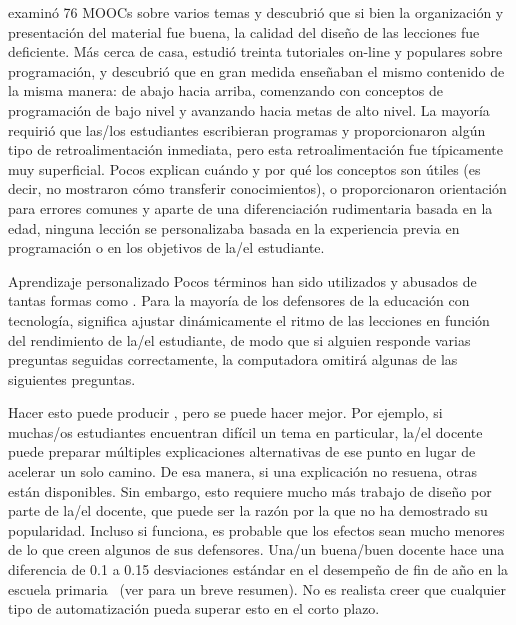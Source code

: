 \cite{Marg2015} examinó 76 MOOCs sobre varios temas y descubrió que
si bien la organización y presentación del material fue buena,
la calidad del diseño de las lecciones fue deficiente.
Más cerca de casa,
\cite{Kim2017} estudió treinta tutoriales on-line y populares sobre programación,
y descubrió que en gran medida enseñaban el mismo contenido de la misma manera:
de abajo hacia arriba,
comenzando con conceptos de programación de bajo nivel y avanzando hacia metas de alto nivel.
La mayoría requirió que las/los estudiantes escribieran programas y proporcionaron algún tipo de retroalimentación inmediata,
pero esta retroalimentación fue típicamente muy superficial.
Pocos explican cuándo y por qué los conceptos son útiles
(es decir, no mostraron cómo transferir conocimientos),
o proporcionaron orientación para errores comunes
y aparte de una diferenciación rudimentaria basada en la edad,
ninguna lección se personalizaba basada en la experiencia previa en programación o en los objetivos de la/el estudiante.

\begin{aside}{Aprendizaje personalizado}
  Pocos términos han sido utilizados y abusados de tantas formas
  como .
  Para la mayoría de los defensores de la educación con tecnología,
  significa ajustar dinámicamente el ritmo de las lecciones en función del rendimiento de la/el estudiante,
  de modo que si alguien responde varias preguntas seguidas correctamente,
  la computadora omitirá algunas de las siguientes preguntas.

  Hacer esto puede producir
  ,
  pero se puede hacer mejor.
  Por ejemplo,
  si muchas/os estudiantes encuentran difícil un tema en particular,
  la/el docente puede preparar múltiples explicaciones alternativas de ese punto
  en lugar de acelerar un solo camino.
  De esa manera,
  si una explicación no resuena,
  otras están disponibles.
  Sin embargo,
  esto requiere mucho más trabajo de diseño por parte de la/el docente,
  que puede ser la razón por la que no ha demostrado su popularidad.
  Incluso si funciona,
  es probable que los efectos sean mucho menores de lo que creen algunos de sus defensores.
  Una/un buena/buen docente hace una diferencia de 0.1 a 0.15 desviaciones estándar en el desempeño de fin de año en la escuela primaria~\cite{Chet2014}
  (ver  para un breve resumen).
  No es realista creer que cualquier tipo de automatización pueda superar esto en el corto plazo.
\end{aside}

